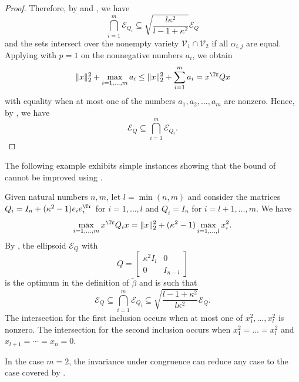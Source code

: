 \documentclass[11pt,twoside,a4paper,openright]{uclouvain-thesis}
\newcommand{\johnintm}{\beta}
\newcommand{\johnint}{\tilde{\johnintm}}
\begin{document}
\begin{mytheo}
\begin{proof}
    Therefore, by  and , we have
    \[ \bigcap_{i=1}^m \mathcal{E}_{Q_i} \subseteq \sqrt{\frac{l\kappa^2}{l-1+\kappa^2}} \mathcal{E}_Q \]
    and the sets intersect over the nonempty variety $\mathcal{V}_1 \cap \mathcal{V}_2$
    if all $\alpha_{i,j}$ are equal.
    Applying  with $p = 1$ on the nonnegative numbers $a_i$, we obtain
    \[ \|x\|_2^2 + \max_{i=1, \ldots, m} a_i
    \leq \|x\|_2^2 + \sum_{i=1}^m a_i
    = x^\Tr Q x \]
    with equality when at most one of the numbers $a_1, a_2, \ldots, a_m$ are nonzero.
    Hence, by , we have
    \[ \mathcal{E}_Q \subseteq \bigcap_{i=1}^m \mathcal{E}_{Q_i}. \]
  \end{proof}
\end{mytheo}

The following example exhibits simple instances showing that the bound of  cannot be improved using . %
\begin{myexem}
    \label{exem:jcn}
    Given natural numbers $n, m$, let $l = \min(n, m)$ and
    consider the matrices $Q_i = I_n + (\kappa^2-1)e_ie_i^\Tr$ for $i=1, \ldots, l$ and $Q_i = I_n$ for $i = l + 1, \ldots, m$.
    We have
    \[ \max_{i=1, \ldots, m} x^\Tr Q_i x = \|x\|_2^2 + (\kappa^2-1) \max_{i=1, \ldots, l} x_i^2. \]
    By , the ellipsoid $\mathcal{E}_Q$ with
    \[
      Q =
      \begin{bmatrix}
        \kappa^2 I_l & 0\\
        0 & I_{n-l}
      \end{bmatrix}
    \]
    is the optimum in the definition of $\johnint$ and is such that
    \[ \mathcal{E}_Q \subseteq \bigcap_{i=1}^m \mathcal{E}_{Q_i} \subseteq \sqrt{\frac{l-1+\kappa^2}{l\kappa^2}}\mathcal{E}_Q. \]
    The intersection for the first inclusion occurs when at most one of $x_1^2, \ldots, x_l^2$ is nonzero.
    The intersection for the second inclusion occurs when $x_1^2 = \ldots = x_l^2$ and
    $x_{l+1} = \cdots = x_n = 0$.
\end{myexem}

In the case $m = 2$, the invariance under congruence can reduce any case
to the case covered by .
\end{document}
